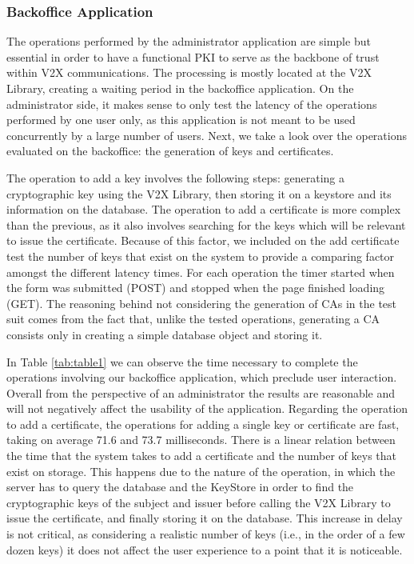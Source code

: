 \subsubsection{Backoffice Application}
The operations performed by the administrator application are simple but essential in order to have a functional PKI to serve as the backbone of trust within V2X communications. The processing is mostly located at the V2X Library, creating a waiting period in the backoffice application. On the administrator side, it makes sense to only test the latency of the operations performed by one user only, as this application is not meant to be used concurrently by a large number of users. Next, we take a look over the operations evaluated on the backoffice: the generation of keys and certificates. 

The operation to add a key involves the following steps: generating a cryptographic key using the V2X Library, then storing it on a keystore and its information on the database. The operation to add a certificate is more complex than the previous, as it also involves searching for the keys which will be relevant to issue the certificate. Because of this factor, we included on the add certificate test the number of keys that exist on the system to provide a comparing factor amongst the different latency times. For each operation the timer started when the form was submitted (POST) and stopped when the page finished loading (GET). The reasoning behind not considering the generation of CAs in the test suit comes from the fact that, unlike the tested operations, generating a CA consists only in creating a simple database object and storing it. 


In Table \ref{tab:table1} we can observe the time necessary to complete the operations involving our backoffice application, which preclude user interaction. Overall from the perspective of an administrator the results are reasonable and will not negatively affect the usability of the application. Regarding the operation to add a certificate, the operations for adding a single key or certificate are fast, taking on average 71.6 and 73.7 milliseconds. There is a linear relation between the time that the system takes to add a certificate and the number of keys that exist on storage. This happens due to the nature of the operation, in which the server has to query the database and the KeyStore in order to find the cryptographic keys of the subject and issuer before calling the V2X Library to issue the certificate, and finally storing it on the database. This increase in delay is not critical, as considering a realistic number of keys (i.e., in the order of a few dozen keys) it does not affect the user experience to a point that it is noticeable.

